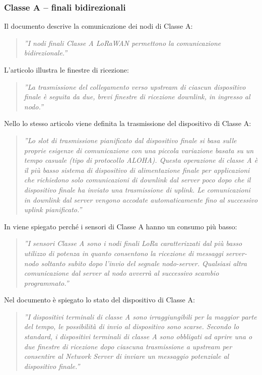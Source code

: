 \documentclass[a4paper]{report} %
\begin{document}
\subsubsection{Classe A – finali bidirezionali}
Il documento \cite{art:rif.27} descrive la comunicazione dei nodi di Classe A:
\begin{quote}
	\textit{''I nodi finali Classe A LoRaWAN permettono la comunicazione bidirezionale.''}  
\end{quote}
L'articolo \cite{art:rif.31} illustra le finestre di ricezione:
\begin{quote}
	\textit{''La trasmissione del collegamento verso upstream di ciascun dispositivo finale è seguita da due, brevi finestre di ricezione downlink, in ingresso al nodo.''}
\end{quote}
Nello lo stesso articolo viene definita la trasmissione del dispositivo di Classe A:
\begin{quote}
	\textit{''Lo slot di trasmissione pianificato dal dispositivo finale si basa sulle proprie esigenze di comunicazione con una piccola variazione basata su un tempo casuale (tipo di protocollo ALOHA). Questa operazione di classe A è il più basso sistema di dispositivo di alimentazione finale per applicazioni che richiedono solo comunicazioni di downlink dal server poco dopo che il dispositivo finale ha inviato una trasmissione di uplink. Le comunicazioni in downlink dal server vengono accodate automaticamente fino al successivo uplink pianificato.''} 
\end{quote}
In \cite{art:rif.27} viene spiegato perché i sensori di Classe A hanno un consumo più basso:
\begin{quote}
	\textit{''I sensori Classe A sono i nodi finali LoRa caratterizzati dal più basso utilizzo di potenza in quanto consentono la ricezione di messaggi server-nodo soltanto subito dopo l’invio del segnale nodo-server. Qualsiasi altra comunicazione dal server al nodo avverrà al successivo scambio programmato.''}  
\end{quote}
Nel documento \cite{art:rif.49} è spiegato lo stato del dispositivo di Classe A:
\begin{quote}
	\textit{''I dispositivi terminali di classe A sono irraggiungibili per la maggior parte del tempo, le possibilità di invio al dispositivo sono scarse. Secondo lo standard, i dispositivi terminali di classe A sono obbligati ad aprire una o due finestre di ricezione dopo ciascuna trasmissione a upstream per consentire al Network Server di inviare un messaggio potenziale al dispositivo finale.''} 
\end{quote}
\end{document}
